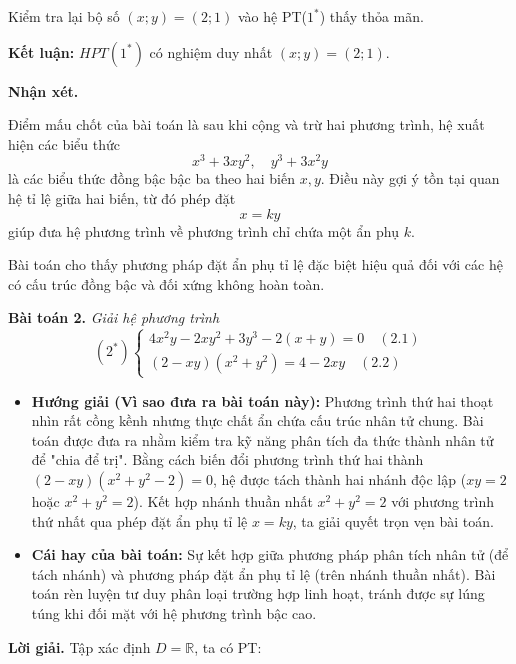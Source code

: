 \documentclass[12pt]{report}
\begin{document}
\vspace{0.2cm}
\noindent Kiểm tra lại bộ số $(x; y) = (2; 1)$ vào hệ PT($1^*$) thấy thỏa mãn.

\vspace{0.2cm}
\noindent \textbf{Kết luận:} $HPT(1^*)$ có nghiệm duy nhất $(x; y) = (2; 1)$.

\vspace{0.3cm}
\noindent \textbf{Nhận xét.}

\vspace{0.1cm}
\noindent Điểm mấu chốt của bài toán là sau khi cộng và trừ hai phương trình, hệ xuất hiện các biểu thức
\[
x^3 + 3xy^2, \quad y^3 + 3x^2y
\]
là các biểu thức đồng bậc bậc ba theo hai biến $x, y$. Điều này gợi ý tồn tại quan hệ tỉ lệ giữa hai biến, từ đó phép đặt
\[
x = ky
\]
giúp đưa hệ phương trình về phương trình chỉ chứa một ẩn phụ $k$.

\vspace{0.2cm}
\noindent Bài toán cho thấy phương pháp đặt ẩn phụ tỉ lệ đặc biệt hiệu quả đối với các hệ có cấu trúc đồng bậc và đối xứng không hoàn toàn.

\vspace{0.4cm}
\noindent \textbf{Bài toán 2.} \textit{Giải hệ phương trình}
\[
(2^*) \begin{cases}
4x^2y - 2xy^2 + 3y^3 - 2(x + y) = 0 \quad (2.1) \\
(2 - xy)(x^2 + y^2) = 4 - 2xy \quad (2.2)
\end{cases}
\]

\begin{itemize}
    \item[\textbf{1.}] \textbf{Hướng giải (Vì sao đưa ra bài toán này):} 
    Phương trình thứ hai thoạt nhìn rất cồng kềnh nhưng thực chất ẩn chứa cấu trúc nhân tử chung. Bài toán được đưa ra nhằm kiểm tra kỹ năng phân tích đa thức thành nhân tử để "chia để trị". Bằng cách biến đổi phương trình thứ hai thành $(2-xy)(x^2+y^2-2) = 0$, hệ được tách thành hai nhánh độc lập ($xy=2$ hoặc $x^2+y^2=2$). Kết hợp nhánh thuần nhất $x^2+y^2=2$ với phương trình thứ nhất qua phép đặt ẩn phụ tỉ lệ $x = ky$, ta giải quyết trọn vẹn bài toán.

    \item[\textbf{2.}] \textbf{Cái hay của bài toán:} 
    Sự kết hợp giữa phương pháp phân tích nhân tử (để tách nhánh) và phương pháp đặt ẩn phụ tỉ lệ (trên nhánh thuần nhất). Bài toán rèn luyện tư duy phân loại trường hợp linh hoạt, tránh được sự lúng túng khi đối mặt với hệ phương trình bậc cao.
\end{itemize}
\vspace{0.2cm}
\noindent \textbf{Lời giải.} Tập xác định $D = \mathbb{R}$, ta có PT:
\end{document}
